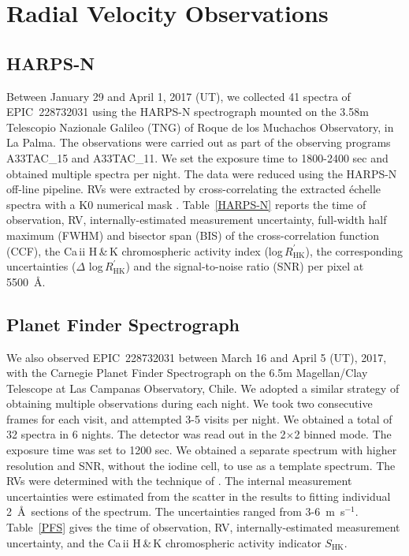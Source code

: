\documentclass[twocolumn]{aastex61}
\begin{document}
\section{Radial Velocity Observations}

\subsection{HARPS-N}

Between January 29 and April 1, 2017 (UT), we collected 41 spectra of EPIC~228732031 using the HARPS-N spectrograph \citep[R\,$\approx$\,115000;][]{Cosentino2012} mounted on the 3.58m Telescopio Nazionale Galileo (TNG) of Roque de los Muchachos Observatory, in La Palma. The observations were carried out as part of the observing programs A33TAC\_15 and A33TAC\_11. We set the exposure time to 1800-2400 sec and obtained multiple spectra per night. The data were reduced using the HARPS-N off-line pipeline. RVs were extracted by cross-correlating the extracted \'echelle spectra with a K0 numerical mask \citep{Pepe2002}. Table~\ref{HARPS-N} reports the
time of observation, RV, internally-estimated measurement uncertainty, full-width half maximum (FWHM) and bisector span (BIS) of the cross-correlation function (CCF), the Ca\,{\sc ii} H\,\&\,K chromospheric activity index (log\,$R^\prime_\mathrm{HK}$), the corresponding uncertainties ($\Delta$ log\,$R^\prime_\mathrm{HK}$) and the signal-to-noise ratio (SNR) per pixel at 5500~\AA. 

\subsection{Planet Finder Spectrograph}

We also observed EPIC~228732031 between March 16 and April 5 (UT), 2017, with the Carnegie Planet Finder Spectrograph \citep[PFS, R\,$\approx$\,76000, ][]{Crane2010} on the 6.5m Magellan/Clay Telescope at Las Campanas Observatory, Chile. We adopted a similar strategy of obtaining multiple observations during each night. We took two consecutive frames for each visit, and attempted 3-5 visits per night. We obtained a total of 32 spectra in 6 nights. The detector was read out in the 2$\times$2 binned mode. The exposure time was set to 1200 sec. We obtained a separate spectrum with higher resolution and SNR, without the iodine cell, to use as a template spectrum. The RVs were determined with the technique of \citet{Butler}. The internal measurement uncertainties were estimated from the scatter in the results to fitting individual 2~\AA~sections of the spectrum. The uncertainties ranged from 3-6~m~s$^{-1}$. Table~\ref{PFS} gives the time of observation, RV, internally-estimated measurement uncertainty, and the Ca\,{\sc ii} H\,\&\,K chromospheric activity indicator $S_{\text{HK}}$.
\end{document}
